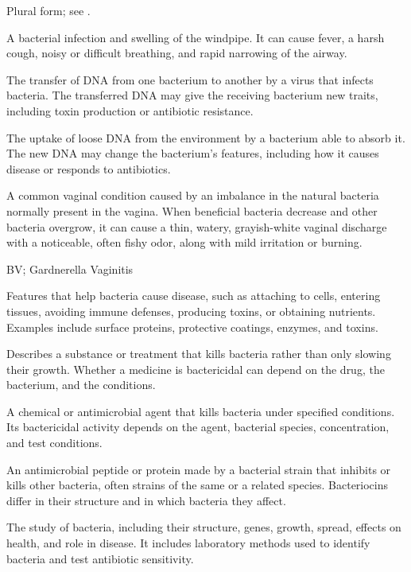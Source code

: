  Plural form; see .

 A bacterial infection and swelling of the windpipe. It can cause fever, a harsh cough, noisy or difficult breathing, and rapid narrowing of the airway.

 The transfer of DNA from one bacterium to another by a virus that infects bacteria. The transferred DNA may give the receiving bacterium new traits, including toxin production or antibiotic resistance.

 The uptake of loose DNA from the environment by a bacterium able to absorb it. The new DNA may change the bacterium's features, including how it causes disease or responds to antibiotics.

 A common vaginal condition caused by an imbalance in the natural bacteria normally present in the vagina. When beneficial bacteria decrease and other bacteria overgrow, it can cause a thin, watery, grayish-white vaginal discharge with a noticeable, often fishy odor, along with mild irritation or burning.

\synonyms
BV; Gardnerella Vaginitis

 Features that help bacteria cause disease, such as attaching to cells, entering tissues, avoiding immune defenses, producing toxins, or obtaining nutrients. Examples include surface proteins, protective coatings, enzymes, and toxins.

 Describes a substance or treatment that kills
bacteria rather than only slowing their growth. Whether a medicine is
bactericidal can depend on the drug, the bacterium, and the conditions.

 A chemical or antimicrobial agent that kills bacteria under specified conditions. Its bactericidal activity depends on the agent, bacterial species, concentration, and test conditions.

 An antimicrobial peptide or protein made by a bacterial strain that inhibits or kills other bacteria, often strains of the same or a related species. Bacteriocins differ in their structure and in which bacteria they affect.

 The study of bacteria, including their structure, genes, growth, spread, effects on health, and role in disease. It includes laboratory methods used to identify bacteria and test antibiotic sensitivity.

